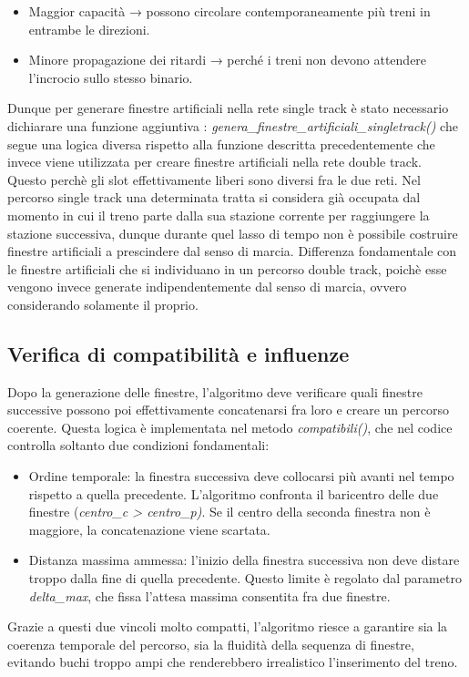 \documentclass[a4paper,12pt]{report}
\begin{document}
\begin{itemize}
    \item Maggior capacità → possono circolare contemporaneamente più treni in entrambe le direzioni.
    
    \item Minore propagazione dei ritardi → perché i treni non devono attendere l’incrocio sullo stesso binario.
\end{itemize}
Dunque per generare finestre artificiali nella rete single track è stato necessario dichiarare una funzione aggiuntiva : \textit{genera\_finestre\_artificiali\_singletrack()} che segue una logica diversa rispetto alla funzione descritta precedentemente che invece viene utilizzata per creare finestre artificiali nella rete double track. \\ Questo perchè gli slot effettivamente liberi sono diversi fra le due reti.
 Nel percorso single track una determinata tratta si considera già occupata dal momento in cui il treno parte dalla sua stazione corrente per raggiungere la stazione successiva, dunque durante quel lasso di tempo non è possibile costruire finestre artificiali a prescindere dal senso di marcia. Differenza fondamentale con le finestre artificiali che si individuano in un percorso double track, poichè esse vengono invece generate indipendentemente dal senso di marcia, ovvero considerando solamente il proprio.

\subsection{Verifica di compatibilità e influenze}

Dopo la generazione delle finestre, l’algoritmo deve verificare quali finestre successive possono poi effettivamente concatenarsi fra loro e creare un percorso coerente.
Questa logica è implementata nel metodo \textit{compatibili()}, che nel codice controlla soltanto due condizioni fondamentali:

\begin{itemize}
    \item Ordine temporale: la finestra successiva deve collocarsi più avanti nel tempo rispetto a quella precedente. L'algoritmo confronta il baricentro delle due finestre (\textit{centro\_c > centro\_p)}. Se il centro della seconda finestra non è maggiore, la concatenazione viene scartata.
   
    \item Distanza massima ammessa: l’inizio della finestra successiva non deve distare troppo dalla fine di quella precedente. Questo limite è regolato dal parametro \textit{delta\_max}, che fissa l’attesa massima consentita fra due finestre.
\end{itemize}
Grazie a questi due vincoli molto compatti, l’algoritmo riesce a garantire sia la coerenza temporale del percorso, sia la fluidità della sequenza di finestre, evitando buchi troppo ampi che renderebbero irrealistico l’inserimento del treno.
\end{document}
